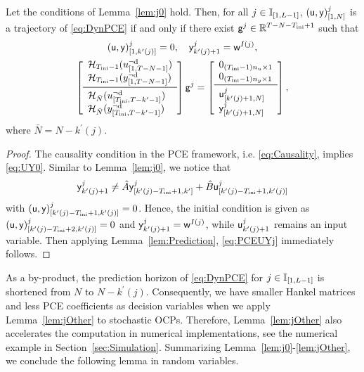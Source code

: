 \begin{lem}\label{lem:jOther}
	Let the conditions of Lemma~\ref{lem:j0} hold.
	Then, for all $j \in \mathbb{I}_{[1,L-1]}$, $(\mathsf{u},\mathsf{y})^j_{[1,N]}$ is a trajectory of \eqref{eq:DynPCE} if and only if there exist $\mathsf{g}^j \in \mathbb{R}^{T-N-T_\text{ini}+1}$ such that
	\begin{subequations}\label{eq:UYjRest}
		\begin{gather}
			\tra{(\pce{u},\pce{y})^j}{1}{k^{\prime}(j)}=0,\quad \pce{y}_{k^\prime(j)+1}^j = \pce{w}^{I(j)}, \label{eq:UY0}\\
			\left[\begin{array}{ll} \Hankel_{\tini-1}(\traud{u}{1}{T-N-1})\\ \Hankel_{\tini-1}(\traud{y}{1}{T-N-1}) \\ \midrule \Hankel_{\bar{N}}(\traud{u}{\tini}{T-k^{\prime}-1}) \\ \Hankel_{\bar{N}}(\traud{y}{\tini}{T-k^{\prime}-1}) \end{array}\right] \pce{g}^j 
			=\left[\begin{array}{ll} 0_{(\tini-1)\dimu\times1} \\ 0_{(\tini-1)\dimy\times1} \\ \midrule\tra{\pce{u}^j}{k^{\prime}(j)+1}{N} \\ \tra{\pce{y}^j}{k^{\prime}(j)+1}{N} \end{array}\right], \label{eq:PCEUYj}
		\end{gather}
	\end{subequations}
	where $\bar{N}=N-k^{\prime}(j)$.
\end{lem}
\begin{proof}
	The causality condition in the PCE framework, i.e. \eqref{eq:Causality}, implies \eqref{eq:UY0}.
	Similar to Lemma~\ref{lem:j0}, we notice that
	\[
		\mathsf{y}_{k^{\prime}(j)+1}^j\neq \hat{A}\mathsf{y}^j_{[k^{\prime}(j)-T_\text{ini}+1,k^{\prime}]} +  \hat{B}\mathsf{u}^j_{[k^{\prime}(j)-T_\text{ini}+1,k^{\prime}(j)]}
	\]
	with $(\mathsf{u},\mathsf{y})^j_{[k^{\prime}(j)-T_\text{ini}+1,k^{\prime}(j)]}=0$. Hence, the initial condition is given as $(\mathsf{u},\mathsf{y})^j_{[k^{\prime}(j)-T_\text{ini}+2,k^{\prime}(j)]}=0$ and $\mathsf{y}_{k^{\prime}(j)+1}^j=\mathsf{w}^{I(j)}$, while $\mathsf{u}_{k^{\prime}(j)+1}^j$ remains an input variable. Then applying Lemma~\ref{lem:Prediction}, \eqref{eq:PCEUYj} immediately follows.
\end{proof}
As a by-product, the prediction horizon of \eqref{eq:DynPCE} for $j\in\mathbb{I}_{[1,L-1]}$ is shortened from $N$ to $N-k^{\prime}(j)$. Consequently, we have smaller Hankel matrices and less PCE coefficients as decision variables when we apply Lemma~\ref{lem:jOther} to stochastic OCPs. Therefore, Lemma~\ref{lem:jOther} also accelerates the computation in numerical implementations, see the numerical example in Section~\ref{sec:Simulation}.
Summarizing Lemma~\ref{lem:j0}-\ref{lem:jOther}, we conclude the following lemma in random variables.

